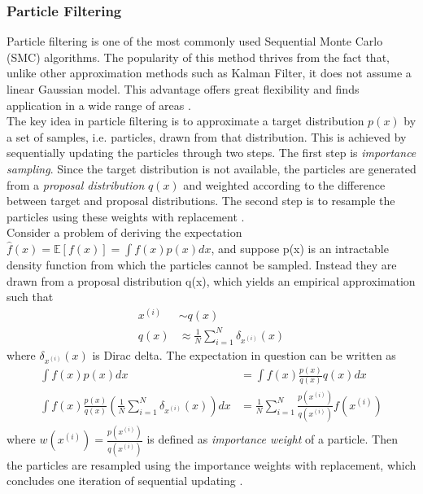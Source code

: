\subsubsection{Particle Filtering}
Particle filtering is one of the most commonly used Sequential Monte Carlo (SMC) algorithms. The popularity of this method thrives from the fact that, unlike other approximation methods such as Kalman Filter, it does not assume a linear Gaussian model. This advantage offers great flexibility and finds application in a wide range of areas \cite{Doucet2009}. \\
The key idea in particle filtering is to approximate a target distribution $ p(x) $ by a set of samples, i.e. particles, drawn from that distribution. This is achieved by sequentially updating the particles through two steps. The first step is \textit{importance sampling}. Since the target distribution is not available, the particles are generated from a \textit{proposal distribution} $ q(x) $ and weighted according to the difference between target and proposal distributions. The second step is to resample the particles using these weights with replacement \cite{Godsill2019}. \\
Consider a problem of deriving the expectation $ \hat{f}(x) = \mathbb{E} \left[ f(x)\right] = \int f(x) p(x)dx $, and suppose p(x) is an intractable density function from which the particles cannot be sampled. Instead they are drawn from a proposal distribution q(x), which yields an empirical approximation such that
\begin{align*}
x^{(i)} & \sim q(x) \\
q(x) & \approx \frac{1}{N} \sum_{i=1}^{N} \delta_{x^{(i)}}(x)
\end{align*}
where $ \delta_{x^{(i)}}(x) $ is Dirac delta. The expectation in question can be written as
\begin{align*}
\int f(x) p(x)dx & = \int f(x) \frac{p(x)}{q(x)} q(x)dx\\
\int f(x) \frac{p(x)}{q(x)} \left( \frac{1}{N} \sum_{i=1}^{N} \delta_{x^{(i)}}(x)\right) dx & = \frac{1}{N} \sum_{i=1}^{N}\frac{p(x^{(i)})}{q(x^{(i)})} f(x^{(i)})
\end{align*}
where $ w(x^{(i)}) = \frac{p(x^{(i)})}{q(x^{(i)})} $ is defined as \textit{importance weight} of a particle. Then the particles are resampled using the importance weights with replacement, which concludes one iteration of sequential updating \cite{Godsill2019}.\\

